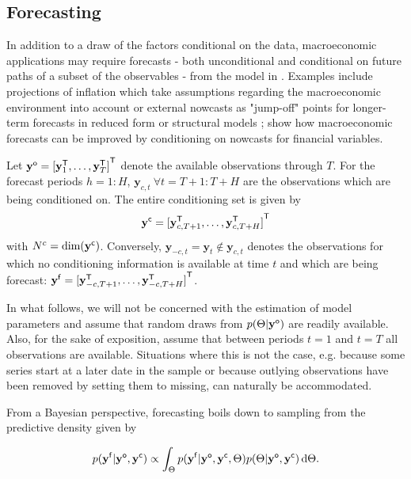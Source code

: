 \documentclass[notitlepage,a4paper,12pt]{article}
\newcommand{\transpose}[1]{{#1}^{\sf{T}}}
\begin{document}
\subsection{Forecasting}\label{subsec:forecasting}

In addition to a draw of the factors conditional on the data, macroeconomic applications may require forecasts - both unconditional and conditional on future paths of a subset of the observables - from the model in . Examples include projections of inflation which take assumptions regarding the macroeconomic environment into account \citep{giannone_etal_2014_ijf} or external nowcasts as "jump-off" points for longer-term forecasts in reduced form or structural models \citep{faustwright2009_jbes,wolters2015_jae,delnegro_schorfheide_2013_hb}; \citet{knotekzaman2019_ijof} show how macroeconomic forecasts can be improved by conditioning on nowcasts for financial variables.

Let $\mathbf{y}^{\sf{o}} = \transpose{[\mathbf{y}^{\sf{T}}_{1}, \dots, \mathbf{y}^{\sf{T}}_{T}]}$ denote the available observations through $T$. For the forecast periods $h = 1:H$, $\mathbf{y}_{c,t}\: \forall t = T+1:T+H$ are the observations which are being conditioned on. The entire conditioning set is given by 
$$
\mathbf{y}^{\sf{c}} = \transpose{[\mathbf{y}^{\sf{T}}_{c,T+1}, \dots, \mathbf{y}^{\sf{T}}_{c,T+H}]}
$$ 
with $N^c = \text{dim}(\mathbf{y}^{\sf{c}})$. Conversely, $\mathbf{y}_{-c,t} = \mathbf{y}_t\notin\mathbf{y}_{c,t}$ denotes the observations for which no conditioning information is available at time $t$ and which are being forecast: $\mathbf{y}^{\sf{f}} = \transpose{[\mathbf{y}^{\sf{T}}_{-c,T+1}, \dots, \mathbf{y}^{\sf{T}}_{-c,T+H}]}$.

In what follows, we will not be concerned with the estimation of model parameters and assume that random draws from $p(\Theta|\mathbf{y}^{\sf{o}})$ are readily available. Also, for the sake of exposition, assume that between periods $t=1$ and $t=T$ all observations are available. Situations where this is not the case, e.g. because some series start at a later date in the sample or because outlying observations have been removed by setting them to missing, can naturally be accommodated.

From a Bayesian perspective, forecasting boils down to sampling from the predictive density given by \citep[see e.g.][]{gewekewhiteman_2006} 

\begin{equation}\label{eqn:preddens}    
    p(\mathbf{y^{\sf{f}}}|\mathbf{y^{\sf{o}}}, \mathbf{y^{\sf{c}}}) \propto \int_{\Theta} p(\mathbf{y^{\sf{f}}}|\mathbf{y^{\sf{o}}},\mathbf{y^{\sf{c}}}, \Theta) p(\Theta|\mathbf{y^{\sf{o}}}, \mathbf{y^{\sf{c}}})\, \text{d}\Theta.
\end{equation}
\end{document}

